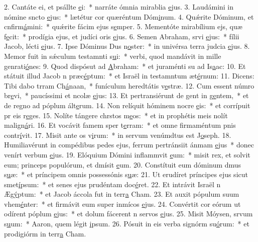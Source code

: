 2. Cantáte ei, et psállte \uline{e}i:~* narráte ómnia mirablia \uline{e}jus.
3. Laudámini in nómine sncto \uline{e}jus:~* lætétur cor quæréntum Dóm\uline{i}num.
4. Quǽrite Dóminum, et cnfirm\uline{á}mini:~* quǽrite fácim ejus s\uline{e}mper.
5. Mementóte mirabílium ejs, quæ f\uline{e}cit:~* prodígia ejus, et judíci oris \uline{e}jus.
6. Semen Abraham, srvi \uline{e}jus:~* fílii Jacob, lécti \uline{e}jus.
7. Ipse Dóminus Dus n\uline{o}ster:~* in univérsa terra judcia \uline{e}jus.
8. Memor fuit in sǽculum testamnti s\uline{u}i:~* verbi, quod mandávit in mille genrati\uline{ó}nes:
9. Quod dispósut ad \uline{A}braham:~* et juraménti su ad Is\uline{a}ac:
10. Et státuit illud Jacob n præc\uline{é}ptum:~* et Israël in testamntum æt\uline{é}rnum:
11. Dicens: Tibi dabo trram Ch\uline{á}naan,~* funículum heredtátis v\uline{e}stræ.
12. Cum essent númro br\uline{e}vi,~* paucíssimi et ncolæ \uline{e}jus:
13. Et pertransiérunt de gent in g\uline{e}ntem,~* et de regno ad póplum ált\uline{e}rum.
14. Non relíquit hóminem nocre \uline{e}is:~* et corrípuit pr eis r\uline{e}ges.
15. Nolíte tángere chrstos m\uline{e}os:~* et in prophétis meis nolít malign\uline{á}ri.
16. Et vocávit famem sper t\uline{e}rram:~* et omne firmaméntum pnis contr\uline{í}vit.
17. Misit ante os v\uline{i}rum:~* in servum venúmdtus est J\uline{o}seph.
18. Humiliavérunt in compédibus pedes ejus, ferrum pertránsiit ánmam \uline{e}jus~* donec venírt verbum \uline{e}jus.
19. Elóquium Dómini inflammvit \uline{e}um:~* misit rex, et solvit eum; princeps populórum, et dmísit \uline{e}um.
20. Constítuit eum dóminum dmus s\uline{u}æ:~* et príncipem omnis possessónis s\uline{u}æ:
21. Ut erudíret príncipes ejus sicut smet\uline{í}psum:~* et senes ejus prudéntam doc\uline{é}ret.
22. Et intrávit Israël n Æg\uline{ý}ptum:~* et Jacob áccola fut in terr\uline{a} Cham.
23. Et auxit pópulum suum vhem\uline{é}nter:~* et firmávit eum super inmícos \uline{e}jus.
24. Convértit cor eórum ut odírent póplum \uline{e}jus:~* et dolum fácerent n servos \uline{e}jus.
25. Misit Móysen, srvum s\uline{u}um:~* Aaron, quem légit \uline{i}psum.
26. Pósuit in eis verba signórm su\uline{ó}rum:~* et prodigiórm in terr\uline{a} Cham.
